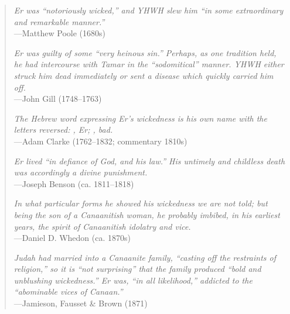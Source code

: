 {\begin{quote}
{			\medskip

			\textsl{Er was ``notoriously wicked,'' and YHWH slew him
			``in some extraordinary and remarkable manner.''}\\
			\hfill ---Matthew Poole (1680s)

			\medskip

			\textsl{Er was guilty of some ``very heinous sin.''
			Perhaps, as one tradition held, he had intercourse
			with Tamar in the ``sodomitical'' manner.
			YHWH either struck him dead immediately or sent a disease which
			quickly carried him off.}\\
			\hfill ---John Gill (1748--1763)

			\medskip


			\medskip

			\textsl{The Hebrew word expressing Er's wickedness is
			his own name with the letters reversed:
			, Er; , bad.}\\
			\hfill ---Adam Clarke (1762--1832; commentary 1810s)

			\medskip


			\medskip

			\textsl{Er lived ``in defiance of God, and his law.''
			His untimely and childless death was accordingly a
			divine punishment.}\\
			\hfill ---Joseph Benson (ca. 1811--1818)

			\medskip

			\textsl{In what particular forms he showed his wickedness we
			are not told; but being the son of a Canaanitish woman, he
			probably imbibed, in his earliest years, the spirit of
			Canaanitish idolatry and vice.}\\
			\hfill ---Daniel D. Whedon (ca. 1870s)

			\medskip

			\textsl{Judah had married into a Canaanite family, ``casting
			off the restraints of religion,'' so it is ``not surprising''
			that the family produced ``bold and unblushing wickedness.''
			Er was, ``in all likelihood,'' addicted to the ``abominable
			vices of Canaan.''}\\
			\hfill ---Jamieson, Fausset \& Brown (1871)

}
\end{quote}}
